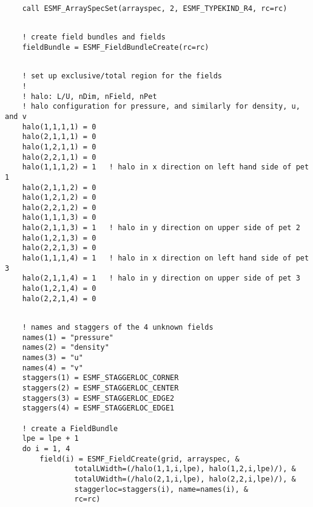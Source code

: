 
 \begin{verbatim}
    call ESMF_ArraySpecSet(arrayspec, 2, ESMF_TYPEKIND_R4, rc=rc)
 
\end{verbatim}
 

 \begin{verbatim}
    ! create field bundles and fields
    fieldBundle = ESMF_FieldBundleCreate(rc=rc)
 
\end{verbatim}
 

 \begin{verbatim}
    ! set up exclusive/total region for the fields
    !
    ! halo: L/U, nDim, nField, nPet
    ! halo configuration for pressure, and similarly for density, u, and v
    halo(1,1,1,1) = 0
    halo(2,1,1,1) = 0
    halo(1,2,1,1) = 0
    halo(2,2,1,1) = 0
    halo(1,1,1,2) = 1   ! halo in x direction on left hand side of pet 1
    halo(2,1,1,2) = 0
    halo(1,2,1,2) = 0
    halo(2,2,1,2) = 0
    halo(1,1,1,3) = 0
    halo(2,1,1,3) = 1   ! halo in y direction on upper side of pet 2
    halo(1,2,1,3) = 0
    halo(2,2,1,3) = 0
    halo(1,1,1,4) = 1   ! halo in x direction on left hand side of pet 3
    halo(2,1,1,4) = 1   ! halo in y direction on upper side of pet 3
    halo(1,2,1,4) = 0
    halo(2,2,1,4) = 0
 
\end{verbatim}
 

 \begin{verbatim}
    ! names and staggers of the 4 unknown fields
    names(1) = "pressure"
    names(2) = "density"
    names(3) = "u"
    names(4) = "v"
    staggers(1) = ESMF_STAGGERLOC_CORNER
    staggers(2) = ESMF_STAGGERLOC_CENTER
    staggers(3) = ESMF_STAGGERLOC_EDGE2
    staggers(4) = ESMF_STAGGERLOC_EDGE1
    
    ! create a FieldBundle
    lpe = lpe + 1
    do i = 1, 4
        field(i) = ESMF_FieldCreate(grid, arrayspec, &
                totalLWidth=(/halo(1,1,i,lpe), halo(1,2,i,lpe)/), &
                totalUWidth=(/halo(2,1,i,lpe), halo(2,2,i,lpe)/), &
                staggerloc=staggers(i), name=names(i), &
                rc=rc)
 
\end{verbatim}
 

